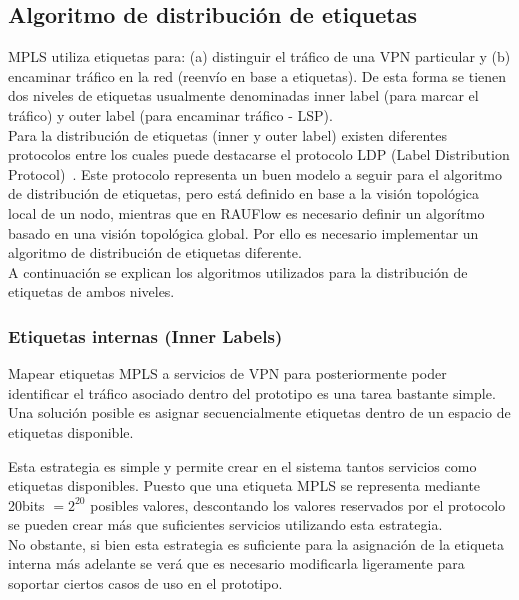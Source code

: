 \newpage
\subsection{Algoritmo de distribución de etiquetas}
\label{section5.5.4}

MPLS utiliza etiquetas para: (a) distinguir el tr\'afico de una VPN particular y (b) encaminar tr\'afico en la red (reenvío en base a etiquetas). De esta forma se tienen dos niveles de etiquetas usualmente denominadas inner label (para marcar el tr\'afico) y outer label (para encaminar tr\'afico - LSP).\\

Para la distribución de etiquetas (inner y outer label) existen diferentes protocolos entre los cuales puede destacarse el protocolo LDP (Label Distribution Protocol)~\citep{LDPRFC}. Este protocolo representa un buen modelo a seguir para el algoritmo de distribución de etiquetas, pero est\'a definido en base a la visión topol\'ogica local de un nodo, mientras que en RAUFlow es necesario definir un algor\'itmo basado en una visi\'on topol\'ogica global. Por ello es necesario implementar un algoritmo de distribución de etiquetas diferente.\\

A continuaci\'on se explican los algoritmos utilizados para la distribución de etiquetas de ambos niveles.

\subsubsection{Etiquetas internas (Inner Labels)}
Mapear etiquetas MPLS a servicios de VPN para posteriormente poder identificar el tr\'afico asociado dentro del prototipo es una tarea bastante simple. Una soluci\'on posible es asignar secuencialmente etiquetas dentro de un espacio de etiquetas disponible.

Esta estrategia es simple y permite crear en el sistema tantos servicios como etiquetas disponibles. Puesto que una etiqueta MPLS se representa mediante 20bits $= 2^{20}$ posibles valores, descontando los  valores reservados por el protocolo se pueden crear m\'as que suficientes servicios utilizando esta estrategia.\\

No obstante, si bien esta estrategia es suficiente para la asignación de la etiqueta interna m\'as adelante se ver\'a que es necesario modificarla ligeramente para soportar ciertos casos de uso en el prototipo.

